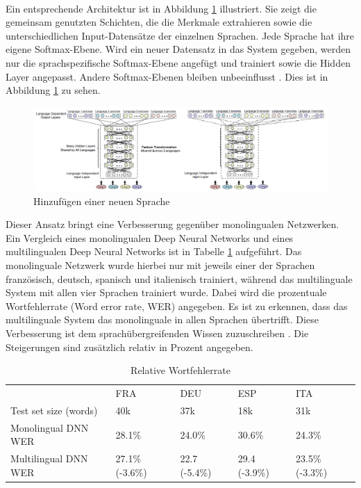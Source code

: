 \\ 
Ein entsprechende Architektur ist in Abbildung \ref{fig:neue_sprache} illustriert. Sie zeigt die gemeinsam genutzten Schichten, die die Merkmale extrahieren sowie die unterschiedlichen Input-Datensätze der einzelnen Sprachen. Jede Sprache hat ihre eigene Softmax-Ebene. Wird ein neuer Datensatz in das System gegeben, werden nur die sprachspezifische Softmax-Ebene angefügt und trainiert sowie die Hidden Layer angepasst. Andere Softmax-Ebenen bleiben unbeeinflusst \cite{Yu.2014}. Dies ist in Abbildung \ref{fig:neue_sprache} zu sehen. 

\begin{figure}[h!]
	\centering
	\includegraphics[width=1.0\linewidth]{images/shared_hidden_layer}
	\caption{Hinzufügen einer neuen Sprache  \cite{GonzalezDominguez.2015}} %
	\label{fig:neue_sprache}
\end{figure}

Dieser Ansatz bringt eine Verbesserung gegenüber monolingualen Netzwerken. Ein Vergleich eines monolingualen Deep Neural Networks und eines multilingualen Deep Neural Networks ist in Tabelle \ref{table} aufgeführt. Das monolinguale Netzwerk wurde hierbei nur mit jeweils einer der Sprachen französisch, deutsch, spanisch und italienisch trainiert, während das multilinguale System mit allen vier Sprachen trainiert wurde. Dabei wird die prozentuale Wortfehlerrate (Word error rate, WER) angegeben. Es ist zu erkennen, dass das multilinguale System das monolinguale in allen Sprachen übertrifft. Diese Verbesserung ist dem sprachübergreifenden Wissen zuzuschreiben {\cite{Yu.2014}}. Die Steigerungen sind zusätzlich relativ in Prozent angegeben. 

\begin{table}[h!]
	\begin{tabular}{lllll}
		& FRA             & DEU           & ESP           & ITA             \\
		Test set size (words) & 40k             & 37k           & 18k           & 31k             \\
		Monolingual DNN WER   & 28.1\%          & 24.0\%        & 30.6\%        & 24.3\%          \\
		Multilingual DNN WER  & 27.1\% (-3.6\%) & 22.7 (-5.4\%) & 29.4 (-3.9\%) & 23.5\% (-3.3\%)
	\end{tabular}
	\centering
	\caption{Relative Wortfehlerrate {\cite{Yu.2014}}}
	\label{table}
\end{table}

